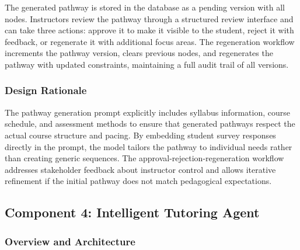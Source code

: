 \documentclass{stylefiles/capstone}
\begin{document}

The generated pathway is stored in the database as a pending version with all nodes. Instructors review the pathway through a structured review interface and can take three actions: approve it to make it visible to the student, reject it with feedback, or regenerate it with additional focus areas. The regeneration workflow increments the pathway version, clears previous nodes, and regenerates the pathway with updated constraints, maintaining a full audit trail of all versions.

\subsubsection{Design Rationale}

The pathway generation prompt explicitly includes syllabus information, course schedule, and assessment methods to ensure that generated pathways respect the actual course structure and pacing. By embedding student survey responses directly in the prompt, the model tailors the pathway to individual needs rather than creating generic sequences. The approval-rejection-regeneration workflow addresses stakeholder feedback about instructor control and allows iterative refinement if the initial pathway does not match pedagogical expectations.

\subsection{Component 4: Intelligent Tutoring Agent}

\subsubsection{Overview and Architecture}
\end{document}
